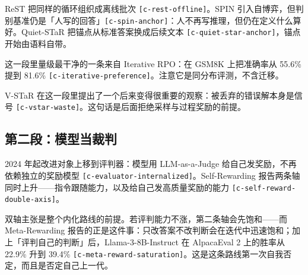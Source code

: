 ReST 把同样的循环组织成离线批次 {\scriptsize\texttt{[c-\hspace{0pt}rest-\hspace{0pt}offline]}}。SPIN 引入自博弈，但判别基准仍是「人写的回答」{\scriptsize\texttt{[c-\hspace{0pt}spin-\hspace{0pt}anchor]}}：人不再写推理，但仍在定义什么算好。Quiet-STaR 把锚点从标准答案换成后续文本 {\scriptsize\texttt{[c-\hspace{0pt}quiet-\hspace{0pt}star-\hspace{0pt}anchor]}}，锚点开始由语料自带。


这一段里量级最干净的一条来自 Iterative RPO：在 GSM8K 上把准确率从 55.6\% 提到 81.6\% {\scriptsize\texttt{[c-\hspace{0pt}iterative-\hspace{0pt}preference]}}。注意它是同分布评测，不含迁移。


V-STaR 在这一段里提出了一个后来变得很重要的观察：被丢弃的错误解本身是信号 {\scriptsize\texttt{[c-\hspace{0pt}vstar-\hspace{0pt}waste]}}。这句话是后面拒绝采样与过程奖励的前提。


\subsection{第二段：模型当裁判}

2024 年起改进对象上移到评判器：模型用 LLM-as-a-Judge 给自己发奖励，不再依赖独立的奖励模型 {\scriptsize\texttt{[c-\hspace{0pt}evaluator-\hspace{0pt}internalized]}}。Self-Rewarding 报告两条轴同时上升——指令跟随能力，以及给自己发高质量奖励的能力 {\scriptsize\texttt{[c-\hspace{0pt}self-\hspace{0pt}reward-\hspace{0pt}double-\hspace{0pt}axis]}}。


双轴主张是整个内化路线的前提。若评判能力不涨，第二条轴会先饱和——而 Meta-Rewarding 报告的正是这件事：只改答案不改判断会在迭代中迅速饱和；加上「评判自己的判断」后，Llama-3-8B-Instruct 在 AlpacaEval 2 上的胜率从 22.9\% 升到 39.4\% {\scriptsize\texttt{[c-\hspace{0pt}meta-\hspace{0pt}reward-\hspace{0pt}saturation]}}。这是这条路线第一次自我否定，而且是否定自己上一代。


